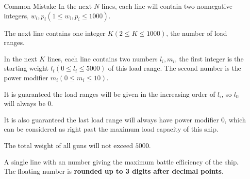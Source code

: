 \begin{problem}{Common Mistake}
In the next $N$ lines, each line will contain two nonnegative integers,
$w_i, p_i (1 \le w_i, p_i \le 1000)$.

The next line contains one integer $K(2\le K \le 1000)$, 
the number of load ranges.

In the next $K$ lines, each line contains two numbers $l_i, m_i$, the 
first integer is the starting weight $l_i (0 \le l_i \le 5000)$ of this load 
range.
The second number is the power modifier $m_i (0 \le m_i \le 10)$.

It is guaranteed the load ranges will be given in the increasing order 
of $l_i$, so $l_0$ will always be 0.

It is also guaranteed the last load range will always have power modifier $0$, 
which can be considered as right past the maximum load capacity of this ship.

The total weight of all guns will not exceed $5000$.
\OutputFile

A single line with an number giving the maximum battle efficiency of the ship.
The floating number is \textbf{rounded up to 3 digits after decimal points}. 

\Examples

\begin{example}
%
%
\end{example}
\end{problem}
